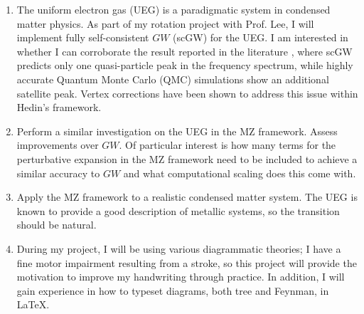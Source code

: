 \begin{enumerate}[label=\textbf{Aim \arabic*}]
    \item The uniform electron gas (UEG) is a paradigmatic system in condensed matter physics. As part of my rotation project with Prof. Lee, I will implement fully self-consistent $GW$ (scGW) for the UEG. I am interested in whether I can corroborate the result reported in the literature \cite{holm_fully_1998}, where scGW predicts only one quasi-particle peak in the frequency spectrum, while highly accurate Quantum Monte Carlo (QMC) simulations show an additional satellite peak. Vertex corrections have been shown to address this issue within Hedin's framework.
    \item Perform a similar investigation on the UEG in the MZ framework. Assess improvements over $GW$. Of particular interest is how many terms for the perturbative expansion in the MZ framework need to be included to achieve a similar accuracy to $GW$ and what computational scaling does this come with.
    \item Apply the MZ framework to a realistic condensed matter system. The UEG is known to provide a good description of metallic systems, so the transition should be natural.
    \item During my project, I will be using various diagrammatic theories; I have a fine motor impairment resulting from a stroke, so this project will provide the motivation to improve my handwriting through practice. In addition, I will gain experience in how to typeset diagrams, both tree and Feynman, in \LaTeX.
\end{enumerate}